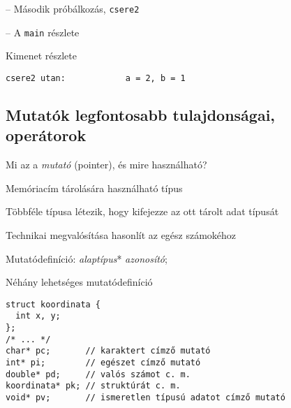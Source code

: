 \documentclass[usenames,dvipsnames,aspectratio=169]{beamer}
\begin{document}
\begin{frame}[fragile]
  \begin{alertblock}{ -- Második próbálkozás, \texttt{csere2}}
    \vspace{-.2cm}
    \scriptsize
    
    \vspace{-.2cm}
  \end{alertblock}
  \begin{alertblock}{ -- A \texttt{main} részlete}
    \vspace{-.2cm}
    \scriptsize
    
    \vspace{-.2cm}
  \end{alertblock}
  \begin{block}{Kimenet részlete}
    \vspace{-.3cm}
    \scriptsize
    \begin{verbatim}
csere2 utan:            a = 2, b = 1
\end{verbatim}
    \vspace{-.3cm}
  \end{block}
\end{frame}

\subsection{Mutatók legfontosabb tulajdonságai, operátorok}
\begin{frame}[fragile]
  Mi az a \emph{mutató} (pointer), és mire használható?
  \begin{compactitem}
    \item Memóriacím tárolására használható típus
    \item Többféle típusa létezik, hogy kifejezze az ott tárolt adat típusát
    \item Technikai megvalósítása hasonlít az egész számokéhoz
    \item Mutatódefiníció: \emph{alaptípus}* \emph{azonosító};
  \end{compactitem}
  \begin{exampleblock}{Néhány lehetséges mutatódefiníció}
    \vspace{-.4cm}
    \small
    \begin{verbatim}
struct koordinata {
  int x, y;
};
/* ... */
char* pc;       // karaktert címző mutató
int* pi;        // egészet címző mutató
double* pd;     // valós számot c. m.
koordinata* pk; // struktúrát c. m.
void* pv;       // ismeretlen típusú adatot címző mutató
\end{verbatim}
    \vspace{-.4cm}
  \end{exampleblock}
\end{frame}
\end{document}
